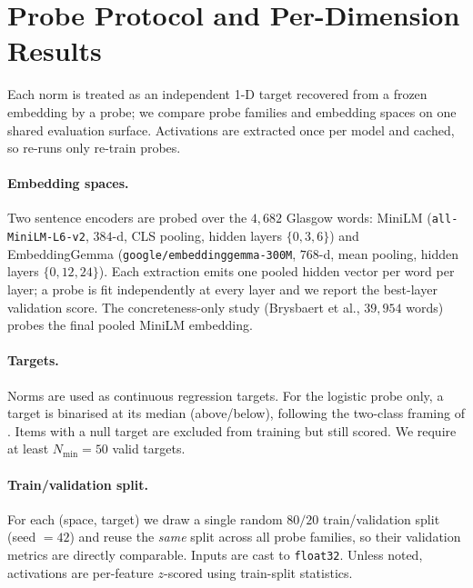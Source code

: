 
\section{Probe Protocol and Per-Dimension Results}
\label{app:probes}

Each norm is treated as an independent 1-D target recovered from a frozen
embedding by a probe; we compare probe families and embedding spaces on one
shared evaluation surface. Activations are extracted once per model and cached,
so re-runs only re-train probes.

\paragraph{Embedding spaces.}
Two sentence encoders are probed over the $4{,}682$ Glasgow words: MiniLM
(\texttt{all-MiniLM-L6-v2}, $384$-d, CLS pooling, hidden layers $\{0,3,6\}$)
and EmbeddingGemma (\texttt{google/embeddinggemma-300M}, $768$-d, mean pooling,
hidden layers $\{0,12,24\}$). Each extraction emits one pooled hidden vector per
word per layer; a probe is fit independently at every layer and we report the
best-layer validation score. The concreteness-only study (Brysbaert et al.,
$39{,}954$ words) probes the final pooled MiniLM embedding.

\paragraph{Targets.}
Norms are used as continuous regression targets. For the logistic probe only,
a target is binarised at its median (above/below), following the two-class
framing of \citet{marks2023geometry}. Items with a null target are excluded
from training but still scored. We require at least $N_{\min}=50$ valid targets.

\paragraph{Train/validation split.}
For each (space, target) we draw a single random $80/20$ train/validation split
(seed $=42$) and reuse the \emph{same} split across all probe families, so their
validation metrics are directly comparable. Inputs are cast to \texttt{float32}.
Unless noted, activations are per-feature $z$-scored using train-split
statistics.

